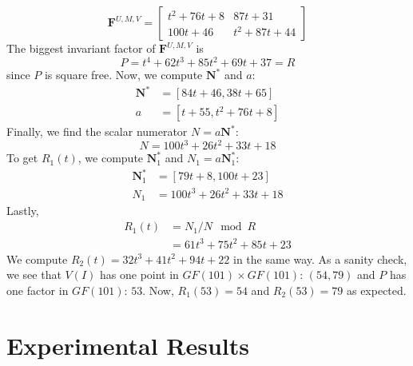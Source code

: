 \documentclass[12pt]{article}
\def\mF{\mathbf{F}}
\def\mN{\mathbf{N}}
\begin{document}
$$ \mF^{U,M,V} =
\begin{bmatrix}
t^2 + 76t + 8&       87t + 31\\
    100t + 46& t^2 + 87t + 44
\end{bmatrix}
$$
The biggest invariant factor of $\mF^{U,M,V}$ is 
$$P = t^4 + 62t^3 + 85t^2 + 69t + 37 = R$$
since $P$ is square free. 
Now, we compute $\mN^*$ and $a$:
\begin{align*}
\mN^* &=[84t + 46, 38t + 65]\\
a &= [t + 55, t^2 + 76t + 8]
\end{align*}
Finally, we find the scalar numerator $N = a\mN^*$:
$$ N = 100t^3 + 26t^2 + 33t + 18$$
To get $R_1(t)$, we compute $\mN_1^*$ and $N_1=a\mN_1^*$:
\begin{align*}
\mN_1^* &= [79t + 8, 100t + 23]\\
N_1 &= 100t^3 + 26t^2 + 33t + 18
\end{align*}
Lastly,
\begin{align*}
R_1(t) &= N_1 / N \mod R \\
       &= 61t^3 + 75t^2 + 85t + 23
\end{align*}
We compute $R_2(t)= 32t^3 + 41t^2 + 94t + 22$ in the same way. 
As a sanity check,
we see that $V(I)$ has one point in $GF(101) \times GF(101)$:
$(54,79)$ and $P$ has one factor in $GF(101)$: $53$. Now,
$R_1(53) = 54$ and $R_2(53) = 79$ as expected.
\newpage
\section{Experimental Results}

\newpage


\end{document}
